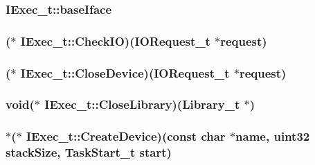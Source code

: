 \hypertarget{structIExec__t_aa6ceae9352c17e6bdc47ec89426f7cec}{
\subsubsection[{base\+Iface}]{ I\+Exec\+\_\+t\+::base\+Iface}}\label{structIExec__t_aa6ceae9352c17e6bdc47ec89426f7cec}
\hypertarget{structIExec__t_a35a562316fd274c0c6980d1dcba532cc}{
\subsubsection[{Check\+I\+O}]{($\ast$ I\+Exec\+\_\+t\+::\+Check\+I\+O)({\bf I\+O\+Request\+\_\+t} $\ast$request)}}\label{structIExec__t_a35a562316fd274c0c6980d1dcba532cc}
\hypertarget{structIExec__t_a4af8d0a31d2f53e3b4b6e95a984d70ab}{
\subsubsection[{Close\+Device}]{($\ast$ I\+Exec\+\_\+t\+::\+Close\+Device)({\bf I\+O\+Request\+\_\+t} $\ast$request)}}\label{structIExec__t_a4af8d0a31d2f53e3b4b6e95a984d70ab}
\hypertarget{structIExec__t_a917810d97701d7666b6bcefd5fade2d7}{
\subsubsection[{Close\+Library}]{\setlength{\rightskip}{0pt plus 5cm}void($\ast$ I\+Exec\+\_\+t\+::\+Close\+Library)({\bf Library\+\_\+t} $\ast$)}}\label{structIExec__t_a917810d97701d7666b6bcefd5fade2d7}
\hypertarget{structIExec__t_a39938177ecec3bf1ad125e2e4d30bf6a}{
\subsubsection[{Create\+Device}]{$\ast$($\ast$ I\+Exec\+\_\+t\+::\+Create\+Device)(const char $\ast$name, {\bf uint32} stack\+Size, {\bf Task\+Start\+\_\+t} start)}}\label{structIExec__t_a39938177ecec3bf1ad125e2e4d30bf6a}
